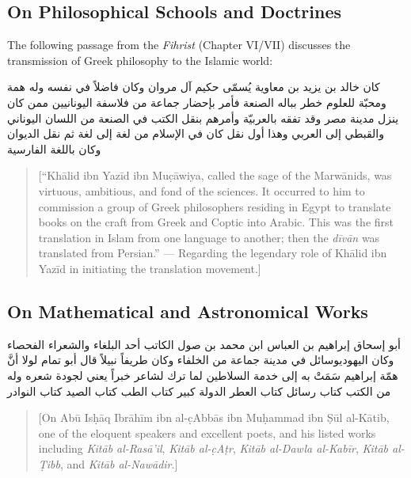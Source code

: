 \documentclass[11pt,a4paper]{article}
\newcommand{\ar}[1]{{\arabicfont\beginR #1\endR}}
\newenvironment{editorialnote}{%
  \begin{quote}
  \small\itshape\color{notecolor}
}{%
  \end{quote}
}
\newenvironment{arabicblock}{%
  \par\vspace{0.5em}%
  \begin{center}%
  \begin{minipage}{0.9\textwidth}%
  \setlength{\parskip}{0pt}%
  \setlength{\parindent}{0pt}%
}{%
  \end{minipage}%
  \end{center}%
  \vspace{0.5em}%
}
\begin{document}
\subsection{On Philosophical Schools and Doctrines}

The following passage from the \textit{Fihrist} (Chapter VI/VII)
discusses the transmission of Greek philosophy to the Islamic world:

\begin{arabicblock}
\ar{كان خالد بن يزيد بن معاوية يُسمّى حكيم آل مروان وكان فاضلاً}
\ar{في نفسه وله همة ومحبّة للعلوم خطر بباله الصنعة فأمر بإحضار}
\ar{جماعة من فلاسفة اليونانيين ممن كان ينزل مدينة مصر وقد تفقه}
\ar{بالعربيّة وأمرهم بنقل الكتب في الصنعة من اللسان اليوناني}
\ar{والقبطي إلى العربي وهذا أول نقل كان في الإسلام من لغة إلى}
\ar{لغة ثم نقل الديوان وكان باللغة الفارسية}
\end{arabicblock}

\begin{editorialnote}
[``Kh\=alid ibn Yaz\=id ibn Mu\d{c}\=awiya, called the sage of the Marw\=anids,
was virtuous, ambitious, and fond of the sciences. It occurred to him
to commission a group of Greek philosophers residing in Egypt to
translate books on the craft from Greek and Coptic into Arabic. This
was the first translation in Islam from one language to another; then
the \textit{d\=iv\=an} was translated from Persian.'' --- Regarding the
legendary role of Kh\=alid ibn Yaz\=id in initiating the translation
movement.]
\end{editorialnote}

\subsection{On Mathematical and Astronomical Works}

\begin{arabicblock}
\ar{أبو إسحاق إبراهيم بن العباس}
\ar{ابن محمد بن صول الكاتب أحد البلغاء والشعراء الفحصاء}
\ar{وكان اليهوديوسائل في مدينة جماعة من الخلفاء وكان طريفاً}
\ar{نبيلاً قال أبو تمام لولا أنَّ همّة إبراهيم سَمَتْ به إلى خدمة}
\ar{السلاطين لما ترك لشاعر خبراً يعني لجودة شعره وله من الكتب}
\ar{كتاب رسائل كتاب العطر الدولة كبير كتاب الطب كتاب الصيد}
\ar{كتاب النوادر}
\end{arabicblock}

\begin{editorialnote}
[On Ab\=u Is\d{h}\=aq Ibr\=ah\=im ibn al-\d{c}Abb\=as ibn Mu\d{h}ammad ibn \d{S}\=ul al-K\=atib,
one of the eloquent speakers and excellent poets, and his listed works
including \textit{Kit\=ab al-Ras\=a'il}, \textit{Kit\=ab al-\d{c}A\d{t}r},
\textit{Kit\=ab al-Dawla al-Kab\=ir}, \textit{Kit\=ab al-\d{T}ibb}, and
\textit{Kit\=ab al-Naw\=adir}.]
\end{editorialnote}
\end{document}
